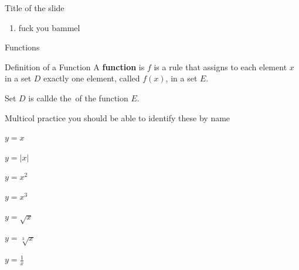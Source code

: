 \documentclass{beamer}
\begin{document}
\begin{frame}[t]{Title of the slide}\vspace{0.5pt}
\begin{enumerate}
\item fuck you bammel
\end{enumerate}
\end{frame}

\begin{frame}[t]{Functions}\vspace{4pt}
\begin{block}{Definition of a Function}
\vspace{0.5em}
A \textbf{function} is $f$ is a rule that assigns to each element $x$ in a set $D$ exactly one element, called $f(x)$, in a set $E$.
\vspace{0.5em}
\end{block}

\vspace{10pt}
Set $D$ is callde the 
\,of the function $E$.\\[10pt]

\end{frame}

\begin{frame}[t]{Multicol practice}\vspace{4pt}
you should be able to identify these by name
\begin{enumerate}
\begin{multicols}{3}
\item $y=x$
\item $y=|x|$
\item $y=x^2$
\item $y=x^3$
\item $y=\sqrt{x}$
\item $y=\sqrt[3]{x}$
\item $y=\frac{1}{x}$
\end{multicols}
\end{enumerate}

\end{frame}
\end{document}
